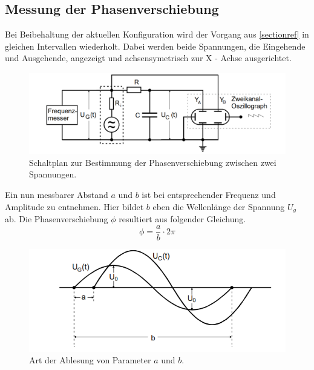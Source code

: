 \subsection{Messung der Phasenverschiebung}
Bei Beibehaltung der aktuellen Konfiguration wird der Vorgang aus \ref{sectionref} in gleichen Intervallen
wiederholt. Dabei werden beide Spannungen, die Eingehende und Ausgehende, angezeigt und achsensymetrisch
zur X - Achse ausgerichtet.\\
\begin{figure}
    \centering 
    \includegraphics[width=\textwidth]{bilder/jetzt.png}
    \caption{Schaltplan zur Bestimmung der Phasenverschiebung zwischen zwei Spannungen.\cite{skript}}
    \label{fig:ab}
\end{figure} 
Ein nun messbarer Abstand $a$ und $b$ %
ist bei entsprechender Frequenz und Amplitude zu entnehmen. Hier bildet $b$ eben die Wellenlänge
der Spannung $U_g$ ab. Die Phasenverschiebung $\phi$ resultiert aus folgender Gleichung.
\begin{equation}
    \label{eqn:phi}
    \phi= \frac{a}{b} \cdot 2 \pi
\end{equation}

\begin{figure}
    \centering
    \includegraphics[width=\textwidth]{bilder/ab2.png}
    \caption{Art der Ablesung von Parameter $a$ und $b$.\cite{skript}}
    \label{fig:ab}
\end{figure}
